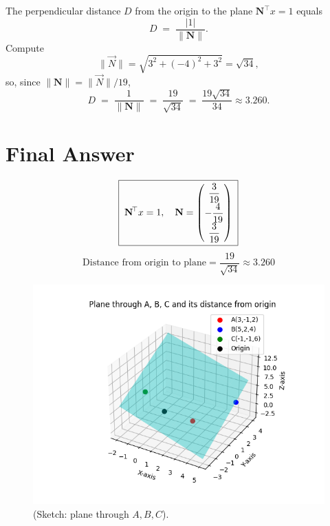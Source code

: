 \documentclass[12pt]{article}
\begin{document}
The perpendicular distance \(D\) from the origin to the plane \(\mathbf{N}^{\!\top}x=1\) equals
\begin{equation}
D \;=\; \frac{|1|}{\|\mathbf{N}\|}.
\label{eq:dist1}
\end{equation}
Compute
\begin{equation}
\|\Vec{N}\| = \sqrt{3^2 + (-4)^2 + 3^2} = \sqrt{34},
\end{equation}
so, since \(\|\mathbf{N}\| = \|\Vec{N}\|/19\),
\begin{equation}
D \;=\; \frac{1}{\|\mathbf{N}\|} \;=\; \frac{19}{\sqrt{34}} \;=\; \frac{19\sqrt{34}}{34} \approx 3.260.
\label{eq:distfinal}
\end{equation}

\section*{Final Answer}
\begin{equation}
\boxed{\;\mathbf{N}^{\!\top}x = 1,\quad
\mathbf{N}=\begin{pmatrix}\dfrac{3}{19}\\[4pt]-\dfrac{4}{19}\\[4pt]\dfrac{3}{19}\end{pmatrix}\;}
\end{equation}
\begin{equation}
\boxed{ \text{Distance from origin to plane} = \dfrac{19}{\sqrt{34}} \approx 3.260 }
\end{equation}

\begin{figure}[h!]
    \centering
    \includegraphics[width=0.65\linewidth]{figs/fig.png}
    \caption{(Sketch: plane through $A,B,C$).}
\end{figure}
\end{document}
